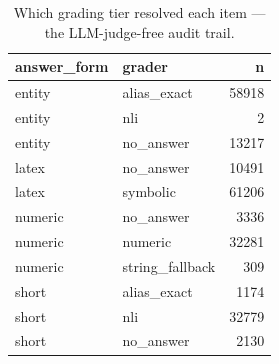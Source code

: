 \begin{table}
\caption{Which grading tier resolved each item — the LLM-judge-free audit trail.}
\label{tab:t4_grader_tier_usage}
\begin{tabular}{llr}
\toprule
answer\_form & grader & n \\
\midrule
entity & alias\_exact & 58918 \\
entity & nli & 2 \\
entity & no\_answer & 13217 \\
latex & no\_answer & 10491 \\
latex & symbolic & 61206 \\
numeric & no\_answer & 3336 \\
numeric & numeric & 32281 \\
numeric & string\_fallback & 309 \\
short & alias\_exact & 1174 \\
short & nli & 32779 \\
short & no\_answer & 2130 \\
\bottomrule
\end{tabular}
\end{table}
